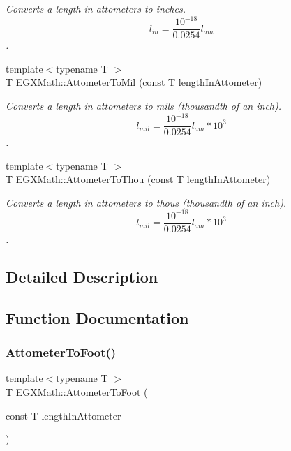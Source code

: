 \begin{DoxyCompactItemize}
\begin{DoxyCompactList}\small\item\em Converts a length in attometers to inches. \[ l_{in}= \frac{10^{-18}}{0.0254} l_{am} \]. \end{DoxyCompactList}\item 
{\footnotesize template$<$typename T $>$ }\\T \mbox{\hyperlink{group___e_g_x_math-_conversions-_length_conversions-_attometer-_imperial_ga1ad78989a93e5316f787a6412e2c8e3a}{E\+G\+X\+Math\+::\+Attometer\+To\+Mil}} (const T length\+In\+Attometer)
\begin{DoxyCompactList}\small\item\em Converts a length in attometers to mils (thousandth of an inch). \[ l_{mil}= \frac{10^{-18}}{0.0254} l_{am} * 10^{3} \]. \end{DoxyCompactList}\item 
{\footnotesize template$<$typename T $>$ }\\T \mbox{\hyperlink{group___e_g_x_math-_conversions-_length_conversions-_attometer-_imperial_gac9c9742b80b24da4e531fbcdc39976bb}{E\+G\+X\+Math\+::\+Attometer\+To\+Thou}} (const T length\+In\+Attometer)
\begin{DoxyCompactList}\small\item\em Converts a length in attometers to thous (thousandth of an inch). \[ l_{mil}= \frac{10^{-18}}{0.0254} l_{am} * 10^{3} \]. \end{DoxyCompactList}\end{DoxyCompactItemize}


\subsection{Detailed Description}


\subsection{Function Documentation}
\mbox{\label{group___e_g_x_math-_conversions-_length_conversions-_attometer-_imperial_gaa4c9d59d58ec5811452592887a0261d9}} 
\subsubsection{\texorpdfstring{Attometer\+To\+Foot()}{AttometerToFoot()}}
{\footnotesize\ttfamily template$<$typename T $>$ \\
T E\+G\+X\+Math\+::\+Attometer\+To\+Foot (\begin{DoxyParamCaption}\item[{const T}]{length\+In\+Attometer }\end{DoxyParamCaption})}



